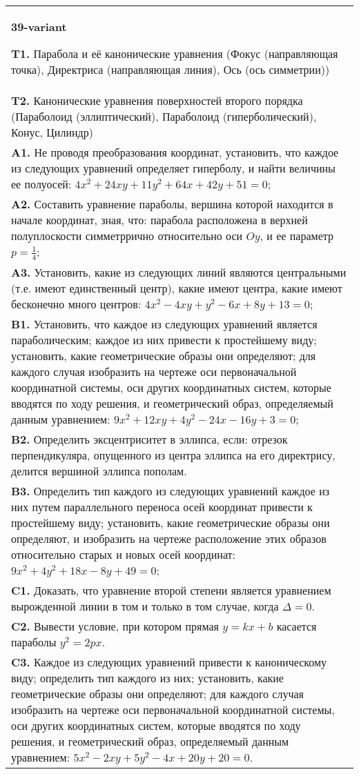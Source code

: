 \documentclass{article}
\begin{document}
\begin{tabular}{m{17cm}}
\textbf{39-variant}
\newline

\textbf{T1.} Парабола и её канонические уравнения (Фокус (направляющая точка), Директриса (направляющая линия), Ось (ось симметрии)) \\
\textbf{T2.} Канонические уравнения поверхностей второго порядка (Параболоид (эллиптический), Параболоид (гиперболический), Конус, Цилиндр) \\
\textbf{A1.} Не проводя преобразования координат, установить, что каждое из следующих уравнений определяет гиперболу, и найти величины ее полуосей: $4 x^2+24 x y+11 y^2+64 x+42 y+51=0$; \\
\textbf{A2.} Составить уравнение параболы, вершина которой находится в начале координат, зная, что: парабола расположена в верхней полуплоскости симметррично относительно оси $O y$, и ее параметр $p=\frac{1}{4}$; \\
\textbf{A3.} Установить, какие из следующих линий являются центральными (т.е. имеют единственный центр), какие имеют центра, какие имеют бесконечно много центров: $4 x^2-4 x y+y^2-6 x+8 y+13=0$; \\
\textbf{B1.} Установить, что каждое из следующих уравнений является параболическим; каждое из них привести к простейшему виду; установить, какие геометрические образы они определяют; для каждого случая изобразить на чертеже оси первоначальной координатной системы, оси других координатных систем, которые вводятся по ходу решения, и геометрический образ, определяемый данным уравнением: $9 x^2+12 x y+4 y^2-24 x-16 y+3=0$; \\
\textbf{B2.} Определить эксцентриситет в эллипса, если: отрезок перпендикуляра, опущенного из центра эллипса на его директрису, делится вершиной эллипса пополам. \\
\textbf{B3.} Определить тип каждого из следующих уравнений каждое из них путем параллельного переноса осей координат привести к простейшему виду; установить, какие геометрические образы они определяют, и изобразить на чертеже расположение этих образов относительно старых и новых осей координат: $9 x^2+4 y^2+18 x-8 y+49=0$; \\
\textbf{C1.} Доказать, что уравнение второй степени является уравнением вырожденной линии в том и только в том случае, когда $\Delta=0$. \\
\textbf{C2.} Вывести условие, при котором прямая $y=k x+b$ касается параболы $y^2=2 p x$. \\
\textbf{C3.} Каждое из следующих уравнений привести к каноническому виду; определить тип каждого из них; установить, какие геометрические образы они определяют; для каждого случая изобразить на чертеже оси первоначальной координатной системы, оси других координатных систем, которые вводятся по ходу решения, и геометрический образ, определяемый данным уравнением: $5 x^2-2 x y+5 y^2-4 x+20 y+20=0$. \\

\end{tabular}
\vspace{1cm}
\end{document}

